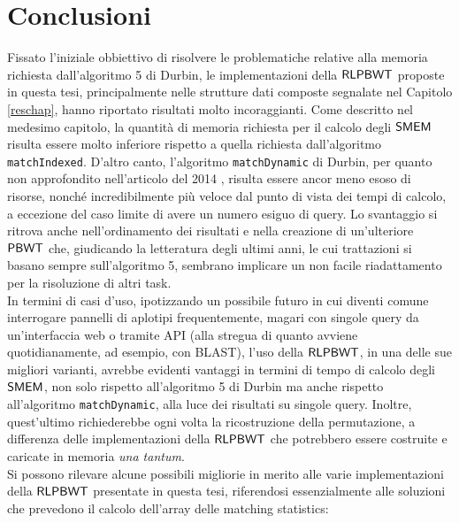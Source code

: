 \documentclass[a4paper,12pt, oneside]{book}
\newcommand{\dc}[1]{\todo[backgroundcolor=yellow]{\textbf{DC} #1}}
\def\PBWT{\mbox{\rm {\sf PBWT}}}
\def\RLPBWT{\mbox{\rm {\sf RLPBWT}}}
\def\SMEM{\mbox{\rm {\sf SMEM}}}
\begin{document}
\chapter{Conclusioni}
\label{conchap}
Fissato l'iniziale obbiettivo di risolvere le problematiche relative alla
memoria richiesta dall'algoritmo 5 di Durbin, le implementazioni della
$\RLPBWT$ proposte in questa tesi, principalmente nelle strutture dati composte
segnalate nel 
Capitolo \ref{reschap}, hanno riportato risultati molto incoraggianti. Come
descritto nel medesimo capitolo, la quantità di memoria richiesta per il calcolo
degli $\SMEM$ risulta essere 
molto inferiore rispetto a quella richiesta dall'algoritmo
\texttt{matchIndexed}. D'altro canto, l'algoritmo \texttt{matchDynamic} di 
Durbin, per quanto non approfondito nell'articolo del 2014 \cite{pbwt}, risulta
essere ancor meno esoso di risorse, nonché incredibilmente più veloce dal punto
di vista dei tempi di calcolo, a eccezione del caso limite di avere un numero
esiguo di query. Lo svantaggio si ritrova anche nell'ordinamento dei risultati
e nella creazione di un'ulteriore $\PBWT$
che, giudicando la letteratura degli ultimi anni, le cui trattazioni si basano
sempre sull'algoritmo 5, sembrano implicare un non facile 
riadattamento per la risoluzione di altri task.\\
In termini di casi d'uso, ipotizzando un possibile futuro in cui diventi comune
interrogare pannelli di aplotipi frequentemente, magari con singole query da
un'interfaccia web o tramite API (alla stregua di quanto avviene
quotidianamente, ad esempio, con BLAST), l'uso della $\RLPBWT$, in una delle sue
migliori varianti, avrebbe evidenti vantaggi in termini di tempo di calcolo
degli $\SMEM$, non solo
rispetto all'algoritmo 5 di Durbin ma anche rispetto all'algoritmo
\texttt{matchDynamic}, 
alla luce dei risultati su singole query. Inoltre, quest'ultimo richiederebbe
ogni volta la ricostruzione della permutazione, a differenza delle
implementazioni della $\RLPBWT$ che potrebbero essere costruite e caricate in
memoria \textit{una tantum}.\\
\dc{Frase da rivedere}
Si possono rilevare alcune possibili migliorie in merito
alle varie implementazioni della $\RLPBWT$ presentate in questa tesi,
riferendosi essenzialmente alle soluzioni che prevedono il calcolo
dell'array delle matching statistics: 
\end{document}
